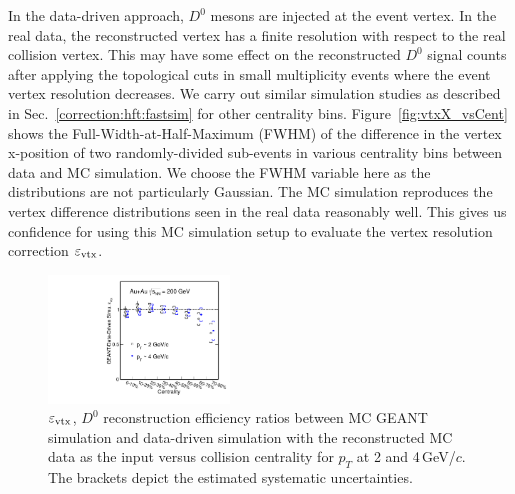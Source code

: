 \documentclass[%
 reprint,	
 amsmath,amssymb,
 aps,
 prc,
]{revtex4-1}
\begin{document}
In the data-driven approach, $D^0$ mesons are injected at the event vertex. In the real data, the reconstructed vertex has a finite resolution with respect to the real collision vertex. This may have some effect on the reconstructed $D^0$ signal counts after applying the topological cuts in small multiplicity events where the event vertex resolution decreases. We carry out similar simulation studies as described in Sec.~\ref{correction:hft:fastsim} for other centrality bins. Figure~\ref{fig:vtxX_vsCent} shows the Full-Width-at-Half-Maximum (FWHM) of the difference in the vertex x-position of two randomly-divided sub-events in various centrality bins between data and MC simulation. We choose the FWHM variable here as the distributions are not particularly Gaussian. The MC simulation reproduces the vertex difference distributions seen in the real data reasonably well. This gives us confidence for using this MC simulation setup to evaluate the vertex resolution correction $\varepsilon_{\rm vtx}$.

\begin{figure}
\centering
\includegraphics[width=0.43\textwidth]{fig/Mcd0Eff_20_80_vsCent.pdf}
\caption{$\varepsilon_{\rm vtx}$, $D^0$ reconstruction efficiency ratios between MC GEANT simulation and data-driven simulation with the reconstructed MC data as the input versus collision centrality for $p_{T}$ at 2 and 4\,GeV/$c$. The brackets depict the estimated systematic uncertainties.}
\label{fig:Mcd0Eff_20_80_vsCent} 
\end{figure}
\end{document}
